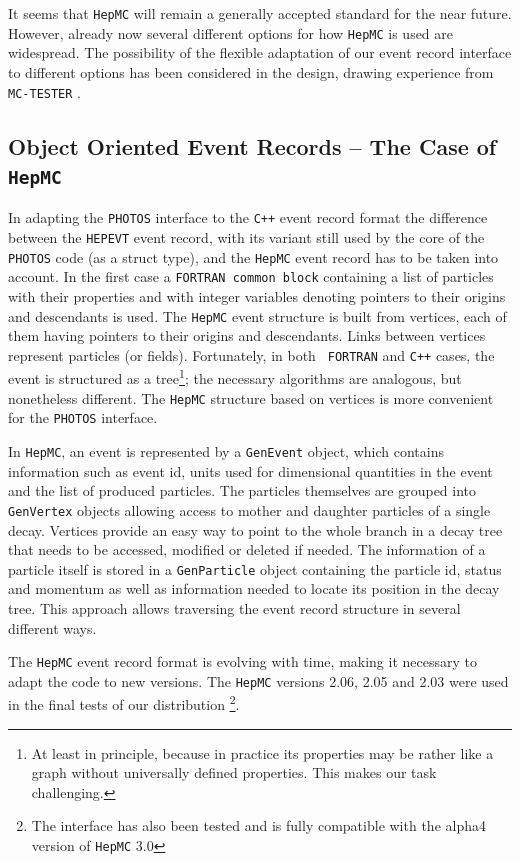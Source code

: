 \documentclass[]{Photos_interface_design}
\begin{document}
It seems that {\tt HepMC} will
remain a generally accepted standard for the near future. However,
already now several different options for how {\tt HepMC} is used are
widespread. The possibility of the flexible  adaptation of our event record 
interface to different
options has been considered in the design,  drawing experience
from {\tt MC-TESTER} \cite{Davidson:2008ma,Golonka:2002rz}.

\subsection{Object Oriented Event Records  -- The Case of {\tt HepMC}}
 In adapting the {\tt PHOTOS} interface to the {\tt C++} event record format
the difference between the {\tt HEPEVT} event record, with its variant still used
by the core of the {\tt PHOTOS} code (as a struct type),
and the {\tt HepMC} event record has to be taken into account.  In the first case 
a {\tt FORTRAN common block} containing a list of particles with their properties and
with integer variables denoting pointers to their origins and
descendants is used.  The {\tt HepMC} event structure is built from vertices,
each of them having pointers to their origins and descendants. Links
between vertices represent particles (or fields).  Fortunately, in both {\tt
  FORTRAN} and {\tt C++} cases, the event is structured as a
tree\footnote{At least in principle, because in practice its
properties may be rather like a graph without universally defined
properties.  This makes our task challenging.}; the necessary
algorithms are analogous, but nonetheless different. The {\tt HepMC}
structure based on vertices is more convenient for the {\tt PHOTOS}
interface. 

In {\tt HepMC}, an event is represented by a {\tt GenEvent} object,
which contains information such as event id,
units used for dimensional quantities in the event and the list of produced particles. The particles
themselves are grouped into {\tt GenVertex} objects allowing access to mother
and daughter particles of a single decay. Vertices provide an easy way
to point to the whole branch in a decay tree that needs to be accessed,
modified or deleted if needed. The information of a particle  itself is stored
in a {\tt GenParticle} object containing the particle id, status and momentum
as well as information needed to locate its position in the decay tree.
This approach allows traversing the event record structure in several different
ways.

The {\tt HepMC} event record format is  evolving with time, making it necessary
 to adapt
the code to new versions. The
{\tt HepMC} versions 2.06, 2.05  and 2.03 were used  in the final tests of our 
distribution%
\footnote{The interface has also been tested and is fully compatible
with the alpha4 version of {\tt HepMC} 3.0}.
\end{document}
